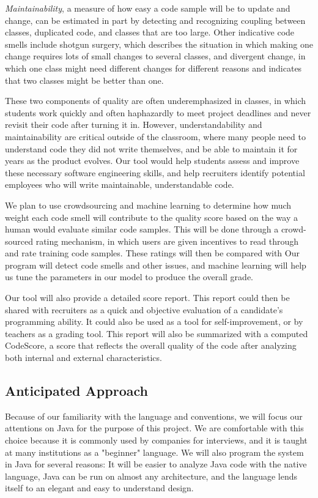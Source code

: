 \documentclass{sig-alternate}
\begin{document}
{\it Maintainability}, a measure of how easy a code sample will be to update and change, can be estimated in part by detecting and recognizing coupling between classes, duplicated code, and classes that are too large. Other indicative code smells include shotgun surgery, which describes the situation in which making one change requires lots of small changes to several classes, and divergent change, in which one class might need different changes for different reasons and indicates that two classes might be better than one.

These two components of quality are often underemphasized in classes, in which students work quickly and often haphazardly to meet project deadlines and never revisit their code after turning it in. However, understandability and maintainability are critical outside of the classroom, where many people need to understand code they did not write themselves, and be able to maintain it for years as the product evolves. Our tool would help students assess and improve these necessary software engineering skills, and help recruiters identify potential employees who will write maintainable, understandable code.

We plan to use crowdsourcing and machine learning to determine how much weight each code smell will contribute to the quality score based on the way a human would evaluate similar code samples. This will be done through a crowd-sourced rating mechanism, in which users are given incentives to read through and rate training code samples. These ratings will then be compared with Our program will detect code smells and other issues, and machine learning will help us tune the parameters in our model to produce the overall grade. 

Our tool will also provide a detailed score report. This report could then be shared with recruiters as a quick and objective evaluation of a candidate's programming ability. It could also be used as a tool for self-improvement, or by teachers as a grading tool. This report will also be summarized with a computed CodeScore, a score that reflects the overall quality of the code after analyzing both internal and external characteristics.

\subsection{Anticipated Approach}
\label{subsec:approach}
Because of our familiarity with the language and conventions, we will focus our attentions on Java for the purpose of this project. We are comfortable with this choice because it is commonly used by companies for interviews, and it is taught at many institutions as a "beginner" language. We will also program the system in Java for several reasons: It will be easier to analyze Java code with the native language, Java can be run on almost any architecture, and the language lends itself to an elegant and easy to understand design.
\end{document}
